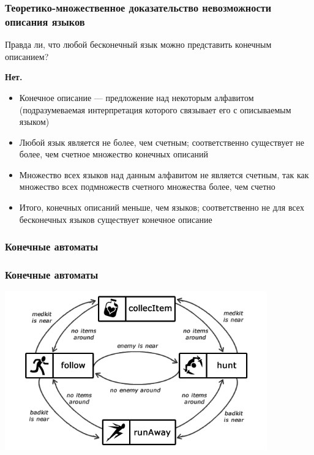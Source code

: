 \documentclass{beamer}
\begin{document}
\begin{frame}[fragile]
  \transwipe[direction=90]
  \frametitle{Теоретико-множественное доказательство невозможности описания языков}

  \begin{center}
    Правда ли, что любой бесконечный язык можно представить конечным описанием?

    \pause \textbf{Нет.}
  \end{center}

  \begin{itemize}
    \item Конечное описание --- предложение над некоторым алфавитом (подразумеваемая интерпретация которого связывает его с описываемым языком) \pause
    \item Любой язык является не более, чем счетным; соответственно существует не более, чем счетное множество конечных описаний \pause
    \item Множество всех языков над данным алфавитом не является счетным, так как множество всех подмножеств счетного множества более, чем счетно \pause
    \item Итого, конечных описаний меньше, чем языков; соответственно не для всех бесконечных языков существует конечное описание
  \end{itemize}
\end{frame}

\begin{frame}[fragile]
  \transwipe[direction=90]
  \frametitle{Конечные автоматы}
  \begin{center}
  \end{center}
\end{frame}

\begin{frame}[fragile]
  \transwipe[direction=90]
  \frametitle{Конечные автоматы}
  \begin{center}
     \includegraphics[width=0.85\textwidth]{pics/game.png}
   \end{center}
\end{frame}
\end{document}
